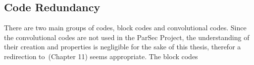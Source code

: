 \documentclass[]{myclass}
\begin{document}
\subsection{Code Redundancy}\label{sub:red}

There are two main groups of codes, block codes and convolutional codes. Since the convolutional codes are not used in the ParSec Project, the understanding of their creation and properties is negligible for the sake of this thesis, therefor a redirection to~\cite{book:Lint}(Chapter 11) seems appropriate.
The block codes


\cleardoublepage
\appendix%

%
{}
\cleardoublepage


\end{document}
